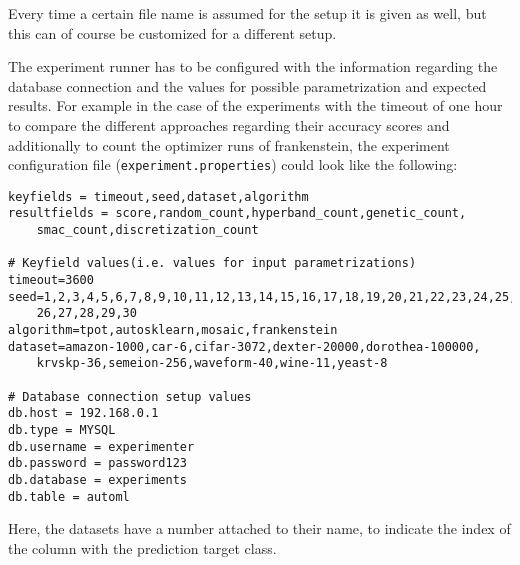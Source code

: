 Every time a certain file name is assumed for the setup it is given as well, but this can of course be customized for a different setup.

The experiment runner has to be configured with the information regarding the database connection and the values for possible parametrization and expected results.
For example in the case of the experiments with the timeout of one hour to compare the different approaches regarding their accuracy scores and additionally to count the optimizer runs of frankenstein, the experiment configuration file (\texttt{experiment.properties}) could look like the following:
\begin{Verbatim}[fontsize=\scriptsize]
keyfields = timeout,seed,dataset,algorithm
resultfields = score,random_count,hyperband_count,genetic_count,
    smac_count,discretization_count

# Keyfield values(i.e. values for input parametrizations)
timeout=3600
seed=1,2,3,4,5,6,7,8,9,10,11,12,13,14,15,16,17,18,19,20,21,22,23,24,25,
    26,27,28,29,30
algorithm=tpot,autosklearn,mosaic,frankenstein
dataset=amazon-1000,car-6,cifar-3072,dexter-20000,dorothea-100000,
    krvskp-36,semeion-256,waveform-40,wine-11,yeast-8

# Database connection setup values
db.host = 192.168.0.1
db.type = MYSQL
db.username = experimenter
db.password = password123
db.database = experiments
db.table = automl
\end{Verbatim}
Here, the datasets have a number attached to their name, to indicate the index of the column with the prediction target class.

